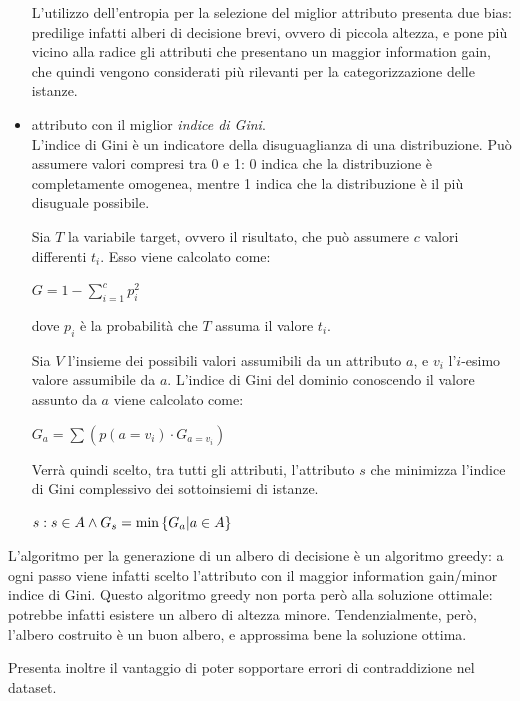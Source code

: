 \begin{itemize}
    L'utilizzo dell'entropia per la selezione del miglior attributo presenta due bias: predilige infatti alberi di decisione brevi, ovvero di piccola altezza, e pone più vicino alla radice gli attributi che presentano un maggior information gain, che quindi vengono considerati più rilevanti per la categorizzazione delle istanze.
    
    \item attributo con il miglior \textit{indice di Gini}.\\
    L'indice di Gini è un indicatore della disuguaglianza di una distribuzione.
    Può assumere valori compresi tra 0 e 1: 0 indica che la distribuzione è completamente omogenea, mentre 1 indica che la distribuzione è il più disuguale possibile.
    
    Sia $T$ la variabile target, ovvero il risultato, che può assumere $c$ valori differenti $t_i$. Esso viene calcolato come:
    \begin{center}
        $G = 1 - \sum\limits_{i=1}^{c} p_i^2$
    \end{center}
    dove $p_i$ è la probabilità che $T$ assuma il valore $t_i$.
    
    Sia $V$ l'insieme dei possibili valori assumibili da un attributo $a$, e $v_i$ l'$i$-esimo valore assumibile da $a$. L'indice di Gini del dominio conoscendo il valore assunto da $a$ viene calcolato come:
    \begin{center}
        $G_a = \sum\limits \left( p(a = v_i) \cdot G_{a = v_i} \right) $
    \end{center}
    Verrà quindi scelto, tra tutti gli attributi, l'attributo $s$ che minimizza l'indice di Gini complessivo dei sottoinsiemi di istanze.
    \begin{center}
        $s : s \in A \land G_s = \textnormal{min}\left\{ G_a | a \in A \right\}$
    \end{center}
\end{itemize}
L'algoritmo per la generazione di un albero di decisione è un algoritmo greedy: a ogni passo viene infatti scelto l'attributo con il maggior information gain/minor indice di Gini. Questo algoritmo greedy non porta però alla soluzione ottimale: potrebbe infatti esistere un albero di altezza minore. Tendenzialmente, però, l'albero costruito è un buon albero, e approssima bene la soluzione ottima.

Presenta inoltre il vantaggio di poter sopportare errori di contraddizione nel dataset.

\clearpage

